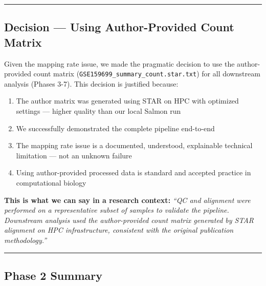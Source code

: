 \documentclass[
]{article}
\providecommand{\tightlist}{%
  \setlength{\itemsep}{0pt}\setlength{\parskip}{0pt}}
\begin{document}
\begin{center}\rule{0.5\linewidth}{0.5pt}\end{center}

\subsection{Decision --- Using Author-Provided Count
Matrix}\label{decision-using-author-provided-count-matrix}

Given the mapping rate issue, we made the pragmatic decision to use the
author-provided count matrix
(\texttt{GSE159699\_summary\_count.star.txt}) for all downstream
analysis (Phases 3-7). This decision is justified because:

\begin{enumerate}
\def\labelenumi{\arabic{enumi}.}
\tightlist
\item
  The author matrix was generated using STAR on HPC with optimized
  settings --- higher quality than our local Salmon run
\item
  We successfully demonstrated the complete pipeline end-to-end
\item
  The mapping rate issue is a documented, understood, explainable
  technical limitation --- not an unknown failure
\item
  Using author-provided processed data is standard and accepted practice
  in computational biology
\end{enumerate}

\textbf{This is what we can say in a research context:} \emph{``QC and
alignment were performed on a representative subset of samples to
validate the pipeline. Downstream analysis used the author-provided
count matrix generated by STAR alignment on HPC infrastructure,
consistent with the original publication methodology.''}

\begin{center}\rule{0.5\linewidth}{0.5pt}\end{center}

\subsection{Phase 2 Summary}\label{phase-2-summary}
\end{document}
